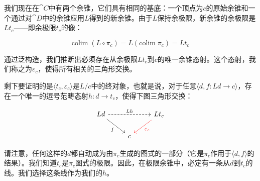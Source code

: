 \documentclass[DaoFP]{subfiles}
\begin{document}
    我们现在在$\cat C$中有两个余锥，它们具有相同的基底：一个顶点为$c$的原始余锥和一个通过对$\cat D$中的余锥应用$L$得到的新余锥。由于$L$保持余极限，新余锥的余极限是$L t_c$——即余极限$t_c$的像：

    \[ \text{colim} \; (L \circ \pi_c) = L ( \text{colim} \; \pi_c) = L t_c\]

    通过泛构造，我们推断出必须存在从余极限$L t_c$到$c$的唯一余锥态射。这个态射，我们称之为$\varepsilon_c$，使得所有相关的三角形交换。

    剩下要证明的是$\langle t_c, \varepsilon_c \rangle$是$L/c$中的终对象，也就是说，对于任意$\langle d, f \colon L d \to c \rangle$，存在一个唯一的逗号范畴态射$h \colon d \to t_c$，使得下图三角形交换：

    \[
        \begin{tikzcd}
            L d
            \arrow[rd, "f"']
            \arrow[rr, dashed, "L h"]
            && L t_c
            \arrow[ld, red, "\varepsilon_c"]
            \\
            &c
        \end{tikzcd}
    \]

    请注意，任何这样的$d$都自动成为由$\pi_c$生成的图式的一部分（它是$\pi_c$作用于$\langle d, f \rangle$的结果）。我们知道$t_c$是$\pi_c$图式的极限。因此，在极限余锥中，必定有一条从$d$到$t_c$的线。我们选择这条线作为我们的$h$。
\end{document}
